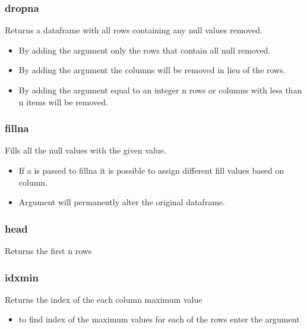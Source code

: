 %
\subsubsection{dropna}
Returns a dataframe with all rows containing any null values removed.
  \begin{itemize}

    \item By adding the argument {\color{red}{how='all'}} only the rows that
      contain all null removed.

    \item By adding the argument {\color{red}{axis=1}} the columns will be
      removed in lieu of the rows.

    \item By adding the argument {\color{red}{thresh}} equal to an integer n
      rows or columns with less than n items will be removed.
  \end{itemize}

%
\subsubsection{fillna}
Fills all the null values with the given value.
  \begin{itemize}

    \item If a {\color{red}{dictionary}} is passed to fillna it is possible
      to assign different fill values based on column.

    \item Argument {\color{red}{inplace=True}} will permanently alter the
      original dataframe.
  \end{itemize}

%
\subsubsection{head}
Returns the first n rows

%
\subsubsection{idxmin}
Returns the index of the each column maximum value
  \begin{itemize}

    \item to find index of the maximum values for each of the rows enter
      the argument \color{red}{axis=1}
  \end{itemize}

